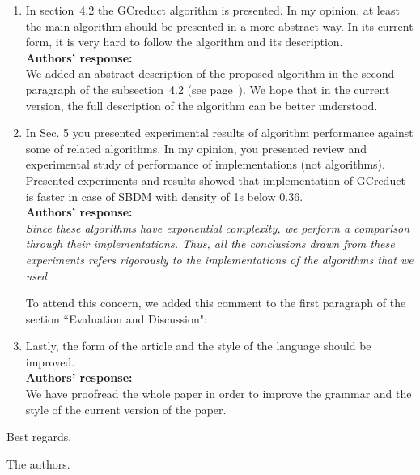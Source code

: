\documentclass{letter}
\begin{document}
\begin{letter}{}
\begin{enumerate}
	\item In section~4.2 the GCreduct algorithm is presented. In my opinion, at least the main algorithm should be presented in a more abstract way. In its current form, it is very hard to follow the algorithm and its description.\\
	\textbf{Authors’ response:}\\
	We added an abstract description of the proposed algorithm in the second paragraph of the subsection~4.2 (see page~\pageref{abstarct}). We hope that in the current version, the full description of the algorithm can be better understood.

	\item In Sec. 5 you presented experimental results of algorithm performance against some of related algorithms. In my opinion, you presented review and experimental  study of performance of implementations (not algorithms). Presented experiments and results showed that implementation of GCreduct is faster in case of SBDM with density of 1s below 0.36.\\
	\textbf{Authors’ response:}\\
	\textit{Since these algorithms have exponential complexity, we perform a comparison through their implementations. Thus, all the conclusions drawn from these experiments refers rigorously to the implementations of the algorithms that we used.}
	
	To attend this concern, we added this comment to the first paragraph of the section ``Evaluation and Discussion":\\
	
	
	\item Lastly, the form of the article and the style of the language should be improved.\\
	\textbf{Authors’ response:}\\
	We have proofread the whole paper in order to improve the grammar and the style of the current version of the paper.
	
	
  \end{enumerate}     
  
  Best regards,

  The authors.
  
\end{letter}
\end{document}
